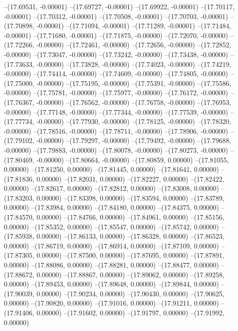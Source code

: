 --(17.69531, -0.00001)
--(17.69727, -0.00001)
--(17.69922, -0.00001)
--(17.70117, -0.00001)
--(17.70312, -0.00001)
--(17.70508, -0.00001)
--(17.70703, -0.00001)
--(17.70898, -0.00001)
--(17.71094, -0.00001)
--(17.71289, -0.00001)
--(17.71484, -0.00001)
--(17.71680, -0.00001)
--(17.71875, -0.00000)
--(17.72070, -0.00000)
--(17.72266, -0.00000)
--(17.72461, -0.00000)
--(17.72656, -0.00000)
--(17.72852, -0.00000)
--(17.73047, -0.00000)
--(17.73242, -0.00000)
--(17.73438, -0.00000)
--(17.73633, -0.00000)
--(17.73828, -0.00000)
--(17.74023, -0.00000)
--(17.74219, -0.00000)
--(17.74414, -0.00000)
--(17.74609, -0.00000)
--(17.74805, -0.00000)
--(17.75000, -0.00000)
--(17.75195, -0.00000)
--(17.75391, -0.00000)
--(17.75586, -0.00000)
--(17.75781, -0.00000)
--(17.75977, -0.00000)
--(17.76172, -0.00000)
--(17.76367, -0.00000)
--(17.76562, -0.00000)
--(17.76758, -0.00000)
--(17.76953, -0.00000)
--(17.77148, -0.00000)
--(17.77344, -0.00000)
--(17.77539, -0.00000)
--(17.77734, -0.00000)
--(17.77930, -0.00000)
--(17.78125, -0.00000)
--(17.78320, -0.00000)
--(17.78516, -0.00000)
--(17.78711, -0.00000)
--(17.78906, -0.00000)
--(17.79102, -0.00000)
--(17.79297, -0.00000)
--(17.79492, -0.00000)
--(17.79688, -0.00000)
--(17.79883, -0.00000)
--(17.80078, -0.00000)
--(17.80273, -0.00000)
--(17.80469, -0.00000)
--(17.80664, -0.00000)
--(17.80859, 0.00000)
--(17.81055, 0.00000)
--(17.81250, 0.00000)
--(17.81445, 0.00000)
--(17.81641, 0.00000)
--(17.81836, 0.00000)
--(17.82031, 0.00000)
--(17.82227, 0.00000)
--(17.82422, 0.00000)
--(17.82617, 0.00000)
--(17.82812, 0.00000)
--(17.83008, 0.00000)
--(17.83203, 0.00000)
--(17.83398, 0.00000)
--(17.83594, 0.00000)
--(17.83789, 0.00000)
--(17.83984, 0.00000)
--(17.84180, 0.00000)
--(17.84375, 0.00000)
--(17.84570, 0.00000)
--(17.84766, 0.00000)
--(17.84961, 0.00000)
--(17.85156, 0.00000)
--(17.85352, 0.00000)
--(17.85547, 0.00000)
--(17.85742, 0.00000)
--(17.85938, 0.00000)
--(17.86133, 0.00000)
--(17.86328, 0.00000)
--(17.86523, 0.00000)
--(17.86719, 0.00000)
--(17.86914, 0.00000)
--(17.87109, 0.00000)
--(17.87305, 0.00000)
--(17.87500, 0.00000)
--(17.87695, 0.00000)
--(17.87891, 0.00000)
--(17.88086, 0.00000)
--(17.88281, 0.00000)
--(17.88477, 0.00000)
--(17.88672, 0.00000)
--(17.88867, 0.00000)
--(17.89062, 0.00000)
--(17.89258, 0.00000)
--(17.89453, 0.00000)
--(17.89648, 0.00000)
--(17.89844, 0.00000)
--(17.90039, 0.00000)
--(17.90234, 0.00000)
--(17.90430, 0.00000)
--(17.90625, 0.00000)
--(17.90820, 0.00000)
--(17.91016, 0.00000)
--(17.91211, 0.00000)
--(17.91406, 0.00000)
--(17.91602, 0.00000)
--(17.91797, 0.00000)
--(17.91992, 0.00000)
